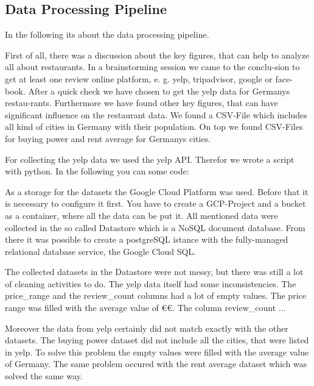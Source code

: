 \subsection{Data Processing Pipeline}
\label{subsec:pipeline}
In the following its about the data processing pipeline.

\label{subsec:Data sources}
First of all, there was a discussion about the key figures, that can help to analyze all about restaurants. In a brainstorming session we came to the conclu-sion to get at least one review online platform, e. g. yelp, tripadvisor, google or face-book. After a quick check we have chosen to get the yelp data for Germanys restau-rants.
Furthermore we have found other key figures, that can have significant influence on the restaurant data. We found a CSV-File which includes all kind of cities in Germany with their population. On top we found CSV-Files for buying power and rent average for Germanys cities.

\label{subsec:Data Ingestion}
For collecting the yelp data we used the yelp API. Therefor we wrote a script with python. In the following you can some code:

\label{subsec:Data Storage}
As a storage for the datasets the Google Cloud Platform was used. Before that it is necessary to configure it first. You have to create a GCP-Project and a bucket as a container, where all the data can be put it. All mentioned data were collected in the so called Datastore which is a NoSQL document database. 
From there it was possible to create a postgreSQL istance with the fully-managed relational database service, the Google Cloud SQL.

\label{subsec:Data cleaning}
The collected datasets in the Datastore were not messy, but there was still a lot of cleaning activities to do. The yelp data itself had some inconsistencies. The price\_range and the review\_count columns had a lot of empty values. The price range was filled with the average value of \euro\euro. 
The column review\_count ...%

Moreover the data from yelp certainly did not match exactly with the other datasets. The buying power dataset did not include all the cities, that were listed in yelp. To solve this problem the empty values were filled with the average value of Germany. The same problem occured with the rent average dataset which was solved the same way.

\label{subsec:Data analysis}
